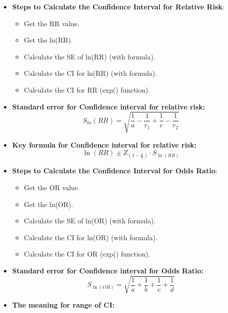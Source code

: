 \documentclass[12pt]{article}
\begin{document}
\begin{itemize}
\item \textbf{Steps to Calculate the Confidence Interval for Relative Risk}:
    \begin{itemize}
    \item Get the RR value.
    \item Get the ln(RR).
    \item Calculate the SE of ln(RR) (with formula).
    \item Calculate the CI for ln(RR) (with formula).
    \item Calculate the CI for RR (exp() function).
    \end{itemize}
\item \textbf{Standard error for Confidence interval for relative risk:}$$S_{ln}(RR) = \sqrt{\frac{1}{a} - \frac{1}{r_1} + \frac{1}{c} - \frac{1}{r_2}}$$
\item \textbf{Key formula for Confidence interval for relative risk:}$$\ln(RR) \pm Z_{(1-\frac{\alpha}{2})} \cdot S_{\ln(RR)}$$
\item \textbf{Steps to Calculate the Confidence Interval for Odds Ratio}:
    \begin{itemize}
    \item Get the OR value.
    \item Get the ln(OR).
    \item Calculate the SE of ln(OR) (with formula).
    \item Calculate the CI for ln(OR) (with formula).
    \item Calculate the CI for OR (exp() function).
    \end{itemize}
\item \textbf{Standard error for Confidence interval for Odds Ratio:} $$S_{\ln(OR)} = \sqrt{\frac{1}{a} + \frac{1}{b} + \frac{1}{c} + \frac{1}{d}}$$
\item \textbf{The meaning for range of CI:}
\begin{figure} [H]
\centering
{}
\end{figure}
\end{itemize}
\end{document}
